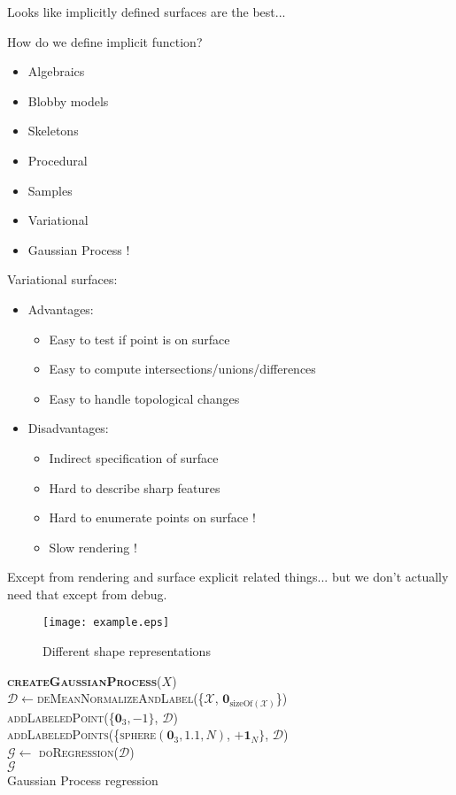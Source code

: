 Looks like implicitly defined surfaces are the best...

How do we define implicit function?
\begin{itemize}
\item Algebraics
\item Blobby models
\item Skeletons
\item Procedural
\item Samples
\item Variational
\item Gaussian Process !
\end{itemize}

Variational surfaces:
\begin{itemize}
\item Advantages:
\begin{itemize} 
\item Easy to test if point is on surface
\item Easy to compute intersections/unions/differences
\item Easy to handle topological changes
\end{itemize}
\item Disadvantages:
\begin{itemize}
\item Indirect specification of surface
\item Hard to describe sharp features
\item Hard to enumerate points on surface !
\item Slow rendering !
\end{itemize}
\end{itemize}

Except from rendering and surface explicit related things... but we don't actually need that except from debug.

\begin{figure}
\centering
  \texttt{[image: example.eps]}
  \caption{Different shape representations} \label{fig:shape_comparison}
\end{figure}

\begin{algorithm}[h]
\textbf{\textsc{createGaussianProcess}}($X$)\\ %
\LinesNumbered
\DontPrintSemicolon
\SetAlgoVlined {} 
  $\mathcal{D} \leftarrow$\textsc{deMeanNormalizeAndLabel}(\{$\mathcal{X}$, $\mathbf{0}_{\text{sizeOf}(\mathcal{X})}$\}) \\
  \textsc{addLabeledPoint}(\{$\mathbf{0}_3, -1\}$, $\mathcal{D}$) \\
  \textsc{addLabeledPoints}(\{\textsc{sphere}$(\mathbf{0}_3, 1.1, N)$, $+\mathbf{1}_{N}\}$, $\mathcal{D}$) \\
  $\mathcal{G} \leftarrow$ \textsc{doRegression}($\mathcal{D}$) \\
  \Return $\mathcal{G}$ \\
\caption{Gaussian Process regression} \label{algo:strategy}
\end{algorithm}

